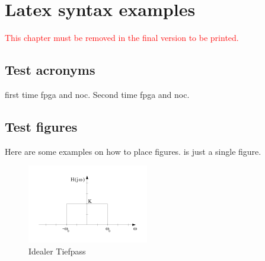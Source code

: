 \chapter{Latex syntax examples}

\textcolor{red}{This chapter must be removed in the final version to be printed.}

\section{Test acronyms}

first time \gls{fpga} and \gls{noc}. Second time \gls{fpga} and \gls{noc}.


%

\section{Test figures}

Here are some examples on how to place figures.  is just a single figure.

\begin{figure}[htb]
	\centering
	\includegraphics[width=.5\linewidth]{figures/tiefpass.png}
	\caption{Idealer Tiefpass}
	\label{fig:tiefpass}
\end{figure}

